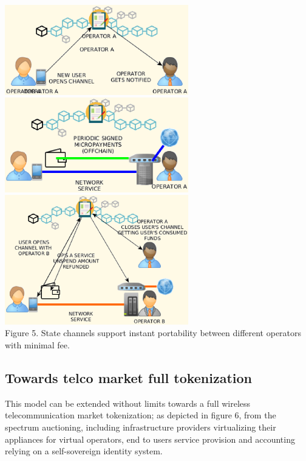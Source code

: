 \documentclass[12pt]{amsart}
\begin{document}
\begin{center}
  \includegraphics[keepaspectratio, width=0.6\textwidth]{images/bc5g/sc1-y.eps}
  \includegraphics[keepaspectratio, width=0.6\textwidth]{images/bc5g/sc2-y.eps}
  \includegraphics[keepaspectratio, width=0.6\textwidth]{images/bc5g/sc3-y.eps}
\\
Figure 5. State channels support instant portability
between different operators with minimal fee.
\\
\end{center}
\begin{multicols}{2}

  \subsection{Towards telco market full tokenization}

  \vspace{0.35cm}

  This model can be extended without limits towards a full wireless
  telecommunication market tokenization; as depicted in figure 6,
  from the spectrum auctioning, including infrastructure providers
  virtualizing their appliances for virtual operators, end to users
  service provision and accounting relying on a self-sovereign
  identity system.


\end{multicols}
\end{document}

